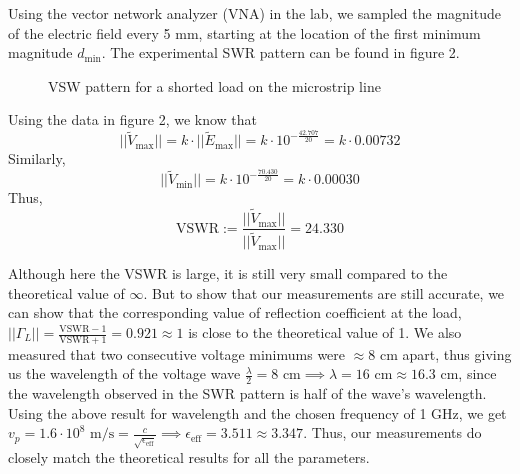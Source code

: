 \documentclass[10pt]{article}
\begin{document}
Using the vector network analyzer (VNA) in the lab, we sampled the magnitude of the electric field every 5 mm, starting at 
the location of the first minimum magnitude $d_\text{min}$. The experimental SWR pattern can be found in figure 2.

\begin{figure}[ht]
  \centering
  \caption{VSW pattern for a shorted load on the microstrip line\vspace{-0.2cm}}
  \label{VNA_log_mag_shorted}
\end{figure}

Using the data in figure 2, we know that
\[||\tilde V_\text{max}|| = k\cdot ||\tilde E_\text{max}|| = k\cdot 10^{-\frac{42.707}{20}} = k\cdot 0.00732\]
Similarly,
  \[ || \tilde V_\text{min}|| = k\cdot 10^{-\frac{70.430}{20}} = k\cdot 0.00030\]
Thus,
  \[\text{VSWR} := \frac{||\tilde V_\text{max}||}{||\tilde V_\text{max}||} = 24.330\]

Although here the VSWR is large, it is still very small compared to the theoretical value of $\infty$. But to
show that our measurements are still accurate, we can show that the corresponding value of reflection coefficient
at the load, $||\Gamma_L|| = \frac{\text{VSWR}-1}{\text{VSWR}+1} = 0.921 \approx 1$ is close to the theoretical value of 1. We also measured that two consecutive voltage minimums were $\approx 8 \text{ cm}$ apart, thus giving us the wavelength 
of the voltage wave $\frac{\lambda}{2} = 8\text{ cm} \implies \lambda = 16\text{ cm} \approx 16.3\text{ cm}$, since the wavelength 
observed in the SWR pattern is half of the wave's wavelength. Using the above result for wavelength and the chosen frequency of 1 GHz, we get 
$v_p = 1.6\cdot10^8 \text{ m/s} = \frac{c}{\sqrt{\epsilon_\text{eff}}} \implies \epsilon_\text{eff} = 3.511 \approx 3.347$. 
Thus, our measurements do closely match the theoretical results for all the parameters.
\vspace{-0.3cm}
\end{document}

